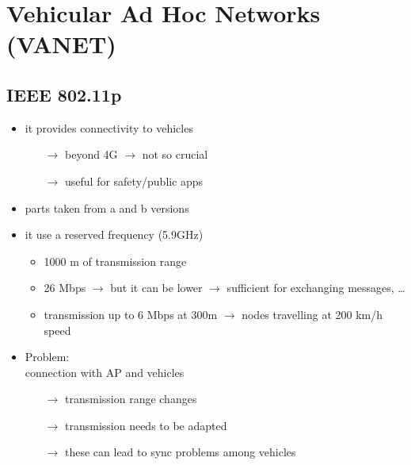 \section{Vehicular Ad Hoc Networks (VANET)}
\subsection{IEEE 802.11p}
\begin{itemize}
    \item it provides connectivity to vehicles
    \begin{itemize}
        \item[$\rightarrow$] beyond 4G $\rightarrow$ not so crucial
        \item[$\rightarrow$] useful for safety/public apps 
    \end{itemize}
    \item parts taken from a and b versions
    \item it use a reserved frequency (5.9GHz)
    \begin{itemize}
        \item 1000 m of transmission range
        \item 26 Mbps $\rightarrow$ but it can be lower $\rightarrow$ sufficient for
        exchanging messages, \dots
        \item transmission up to 6 Mbps at 300m $\rightarrow$ nodes travelling at
        200 km/h speed
    \end{itemize}
    \item Problem:\\[0.15cm]
    connection with AP and vehicles
    \begin{itemize}
        \item[$\rightarrow$] transmission range changes
        \item[$\rightarrow$] transmission needs to be adapted
        \item[$\rightarrow$] these can lead to sync problems among vehicles
    \end{itemize}
\end{itemize}
